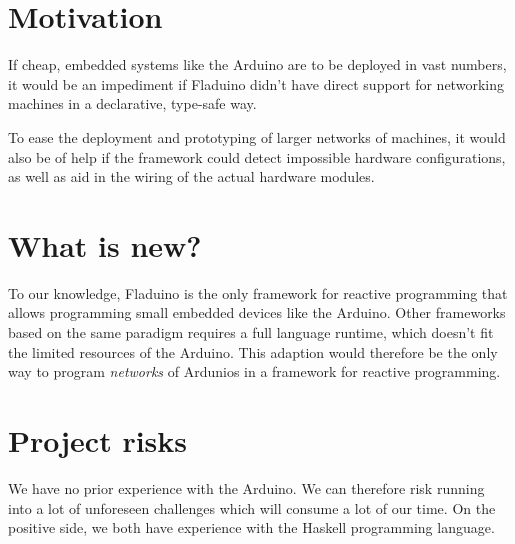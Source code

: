 \documentclass[a4paper, 11pt, oneside, report]{memoir}
\begin{document}
\section*{Motivation}

If cheap, embedded systems like the Arduino are to be deployed in vast numbers,
it would be an impediment if Fladuino didn't have direct support for networking
machines in a declarative, type-safe way.

To ease the deployment and prototyping of larger networks of machines, it would
also be of help if the framework could detect impossible hardware
configurations, as well as aid in the wiring of the actual hardware modules.


\section*{What is new?}

To our knowledge, Fladuino is the only framework for reactive programming that
allows programming small embedded devices like the Arduino. Other frameworks
based on the same paradigm requires a full language runtime, which doesn't fit
the limited resources of the Arduino. This adaption would therefore be the only
way to program \emph{networks} of Ardunios in a framework for reactive
programming.


\section*{Project risks}

We have no prior experience with the Arduino. We can therefore risk running
into a lot of unforeseen challenges which will consume a lot of our time. On
the positive side, we both have experience with the Haskell programming
language.




\end{document}
